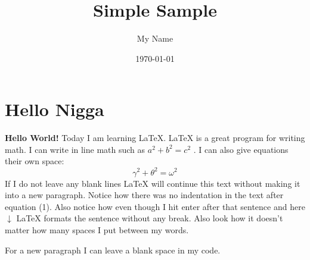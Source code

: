 \documentclass{article} %
\title{Simple Sample} %
\author{My Name} %
\date{\today} %
\begin{document}
    \maketitle %

    \section{Hello Nigga} %

    \textbf{Hello World!} Today I am learning \LaTeX. %
    \LaTeX{} is a great program for writing math. I can write in line math such as $a^2+b^2=c^2$ %
    . I can also give equations their own space:
    \begin{equation} %
        \gamma^2+\theta^2=\omega^2
    \end{equation}
    If I do not leave any blank lines \LaTeX{} will continue  this text without making it into a new paragraph.  Notice how there was no indentation in the text after equation (1).
    Also notice how even though I hit enter after that sentence and here $\downarrow$
    \LaTeX{} formats the sentence without any break.  Also   look  how      it   doesn't     matter          how    many  spaces     I put     between       my    words.

    For a new paragraph I can leave a blank space in my code.
\end{document}
